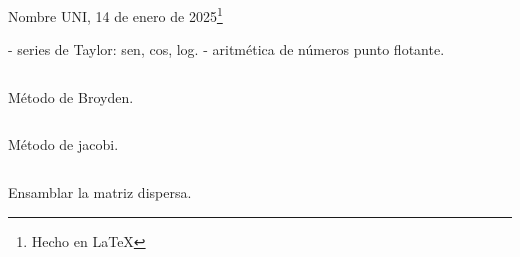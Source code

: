 \providecommand{\name}{Nombre}
\vfill{\noindent \name
}
\hfill{UNI, 14 de enero de 2025\footnote{Hecho en \LaTeX}}



- series de Taylor: sen, cos, log.
- aritmética de números punto flotante.


\begin{listing}[ht!]
    \tiny
    \centering
    \inputminted[linenos,highlightlines={5-16}]{octave}{broyden2.m}
    \caption{Método de Broyden.}
\end{listing}

\begin{listing}[ht!]
    \tiny
    \centering
    \inputminted[linenos,highlightlines={5-15}]{octave}{jacobi.m}
    \caption{Método de jacobi.}
\end{listing}

\begin{listing}[ht!]
    \tiny
    \centering
    \inputminted[linenos,highlightlines={4-20}]{octave}{sparsesetup.m}
    \caption{Ensamblar la matriz dispersa.}
\end{listing}

